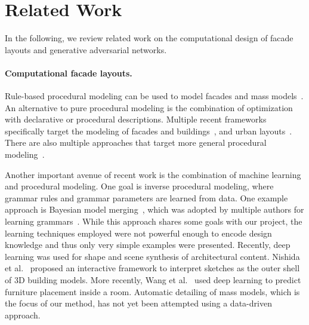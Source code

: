 
\section{Related Work}

In the following, we review related work on the computational design of facade layouts and generative adversarial networks.

\paragraph*{Computational facade layouts.}
Rule-based procedural modeling can be used to model facades and mass models~\cite{Wonka:2003:IA,Mueller:2006:PMB,Schwarz:2015:APM}. An alternative to pure procedural modeling is the combination of optimization with declarative or procedural descriptions. Multiple recent frameworks specifically target the modeling of facades and buildings~\cite{Bokeloh:2012:AMP,Lin:2011:SPR,Bao:2013:PFV,Ilcik:2015:LBP,Dang:2014:SAF}, and urban layouts~\cite{Vanegas:2012:IDU}. There are also multiple approaches that target more general procedural modeling~\cite{Talton:2011:MPM,Yeh:2013:STP,Ritchie:2015:CPM}.


Another important avenue of recent work is the combination of machine learning and procedural modeling. One goal is inverse procedural modeling, where grammar rules and grammar parameters are learned from data. One example approach is Bayesian model merging~\cite{Stolcke:1994:IPG}, which was adopted by multiple authors for learning grammars~\cite{Talton:2012:LDP,Martinovic:2013:BGL}. While this approach shares some goals with our project, the learning techniques employed were not powerful enough to encode design knowledge and thus only very simple examples were presented.
Recently, deep learning was used for shape and scene synthesis of architectural content. Nishida et al.~ proposed an interactive framework to interpret sketches as the outer shell of 3D building models. More recently, Wang et al.~ used deep learning to predict furniture placement inside a room. Automatic detailing of mass models, which is the focus of our method, has not yet been attempted using a data-driven approach. 

